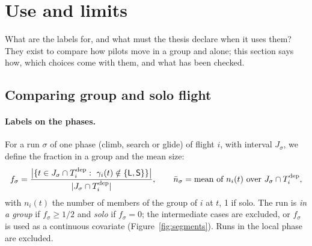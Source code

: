 \section{Use and limits}\label{sec:use-limits}

What are the labels for, and what must the thesis declare when it uses them? They exist to compare
how pilots move in a group and alone; this section says how, which choices come with them, and
what has been checked.

\subsection{Comparing group and solo flight}\label{sec:comparison}

\paragraph{Labels on the phases.} For a run $\sigma$ of one phase (climb, search or glide) of
flight $i$, with interval $J_\sigma$, we define the fraction in a group and the mean size:
\begin{equation}\label{eq:segment}
  f_\sigma=\frac{\bigl|\{t\in J_\sigma\cap T^\dep_i:\ \gamma_i(t)\notin\{\st{L},\st{S}\}\}\bigr|}{|J_\sigma\cap T^\dep_i|},
  \qquad
  \bar n_\sigma=\text{mean of } n_i(t) \text{ over } J_\sigma\cap T^\dep_i ,
\end{equation}
with $n_i(t)$ the number of members of the group of $i$ at $t$, 1 if solo. The run is
\emph{in a group} if $f_\sigma\ge1/2$ and \emph{solo} if $f_\sigma=0$; the intermediate cases are
excluded, or $f_\sigma$ is used as a continuous covariate (Figure~\ref{fig:segments}). Runs in the
local phase are excluded.

